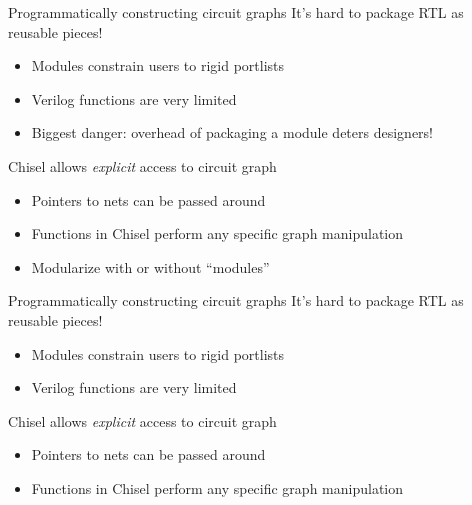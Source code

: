 \documentclass{beamer}
\begin{document}
\begin{frame}{Programmatically constructing circuit graphs}
  It's hard to package RTL as reusable pieces!
  \begin{itemize}
  \item Modules constrain users to rigid portlists
  \item Verilog functions are very limited
  \item Biggest danger: overhead of packaging a module deters designers!
  \end{itemize}
  \vspace*{10mm}
  Chisel allows \textit{explicit} access to circuit graph
  \begin{itemize}
  \item Pointers to nets can be passed around
  \item Functions in Chisel perform any specific graph manipulation
  \item Modularize with or without ``modules''
  \end{itemize}
\end{frame}

\begin{frame}{Programmatically constructing circuit graphs}
  It's hard to package RTL as reusable pieces!
  \begin{itemize}
  \item Modules constrain users to rigid portlists
  \item Verilog functions are very limited
  \end{itemize}
  \vspace*{10mm}
  Chisel allows \textit{explicit} access to circuit graph
  \begin{itemize}
  \item Pointers to nets can be passed around
  \item Functions in Chisel perform any specific graph manipulation
  \end{itemize}
\end{frame}
\end{document}
